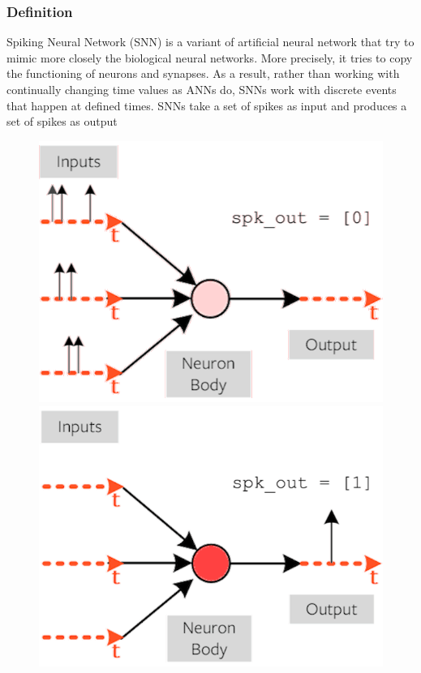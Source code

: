 \documentclass[11pt]{article}
\begin{document}
\subsubsection{Definition}
Spiking Neural Network (SNN) is a variant of artificial neural network that try to mimic more closely the biological neural networks. More precisely, it tries to copy the functioning of neurons and synapses. As a result, rather than working with continually changing time values as ANNs do, SNNs work with discrete events that happen at defined times. SNNs take a set of spikes as input and produces a set of spikes as output

\begin{figure}[h]
  \centering
  \begin{minipage}{0.45\textwidth}
    \centering
    \includegraphics[width=1\textwidth]{image/def1.png}
  \end{minipage}\hfill
  \begin{minipage}{0.45\textwidth}
    \centering
    \includegraphics[width=1\textwidth]{image/def2.png}
  \end{minipage}
\end{figure}
\end{document}
